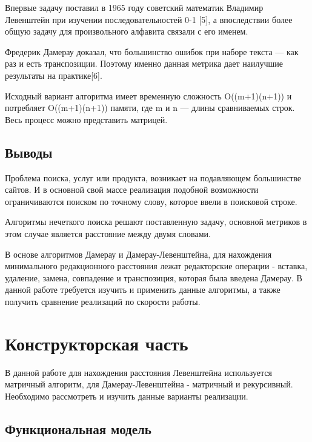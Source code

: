 \documentclass[a4paper,14pt]{article} %
\begin{document}
        Впервые задачу поставил в 1965 году советский математик Владимир Левенштейн при изучении последовательностей 0-1 [5], а впоследствии более общую задачу для произвольного алфавита связали с его именем. 
        \hfill
        
        Фредерик Дамерау доказал, что большинство ошибок при наборе текста — как раз и есть транспозиции. Поэтому именно данная метрика дает наилучшие результаты на практике[6].
        \hfill
        
        Исходный вариант алгоритма имеет временную сложность O((m+1)(n+1)) и потребляет O((m+1)(n+1)) памяти, где m и n — длины сравниваемых строк. Весь процесс можно представить матрицей. 
        
           \subsection{Выводы} 
           \hfill
           
           Проблема поиска, услуг или продукта, возникает на подавляющем большинстве сайтов. И в основной свой массе реализация подобной возможности ограничиваются поиском по точному слову, которое ввели в поисковой строке.
           \hfill
           
           Алгоритмы нечеткого поиска решают поставленную задачу, основной метриков в этом случае является расстояние между двумя словами. 
           \hfill
           
           В основе алгоритмов  Дамерау и Дамерау-Левенштейна, для нахождения минимального редакционного расстояния лежат редакторские операции - вставка, удаление, замена, совпадение и транспозиция, которая была введена Дамерау. В данной работе требуется изучить и применить данные алгоритмы, а также получить сравнение реализаций по скорости работы. 
	  
	\newpage

	\section{Конструкторская часть}
	\hfill
	
	В данной работе для нахождения расстояния Левенштейна используется матричный алгоритм, для Дамерау-Левенштейна - матричный и рекурсивный. Необходимо рассмотреть и изучить данные варианты реализации. 
	\subsection{Функциональная модель}
	\hfill
	
\end{document}
